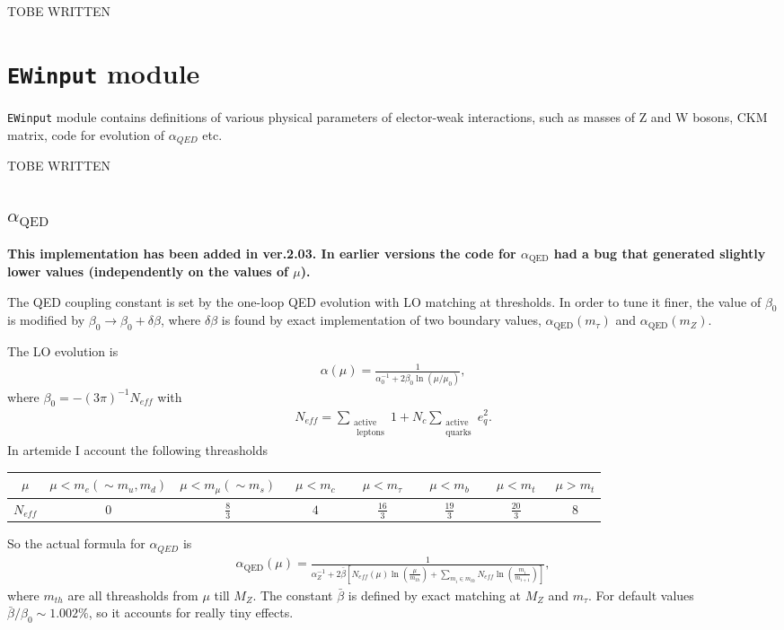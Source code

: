 \documentclass[prd,nofootinbib,eqsecnum,final]{revtex4}
\renewcommand{\(}{\left(}
\renewcommand{\)}{\right)}
\renewcommand{\[}{\left[}
\renewcommand{\]}{\right]}
\newcommand{\red}[1]{{\color[rgb]{1,0,0} #1}}
\begin{document}
\red{TOBE WRITTEN}

\newpage
\section{\texttt{EWinput} module}
\label{EWinput}

\texttt{EWinput} module contains definitions of various physical parameters of elector-weak interactions, such as masses of Z and W bosons, CKM matrix, code for evolution of $\alpha_{QED}$ etc.

\red{TOBE WRITTEN}

\subsection{$\alpha_{\text{QED}}$}

\textbf{This implementation has been added in ver.2.03. In earlier versions the code for $\alpha_{\text{QED}}$ had a bug that generated slightly lower values (independently on the values of $\mu$).}

The QED coupling constant is set by the one-loop QED evolution with LO matching at thresholds. In order to tune it finer, the value of $\beta_0$ is modified by $\beta_0\to \beta_0+\delta \beta$, where $\delta \beta$ is found by exact implementation of two boundary values, $\alpha_{\text{QED}}(m_\tau)$ and $\alpha_{\text{QED}}(m_Z)$. 

The LO evolution is
\begin{eqnarray}
\alpha(\mu)=\frac{1}{\alpha_0^{-1}+2\beta_0 \ln(\mu/\mu_0)},
\end{eqnarray}
where $\beta_0=-(3\pi)^{-1}N_{eff}$ with 
\begin{eqnarray}
N_{eff}=\sum_{\substack{\text{active}\\\text{ leptons}}}1+N_c\sum_{\substack{\text{active}\\\text{quarks}}}e_q^2.
\end{eqnarray}
In artemide I account the following threasholds
\begin{center}
\begin{tabular}{c||c|c|c|c|c|c|c|}
$\mu$   & $\mu<m_e(\sim m_u,m_d)$ & $\mu<m_\mu(\sim m_s)$ & ~$\mu<m_c$~ & ~$\mu<m_\tau$~ & ~$\mu<m_b$~ & ~$\mu<m_t$~ & $\mu>m_t$
\\\hline
$N_{eff}$& 0 & $\frac{8}{3}$ & $4$ & $\frac{16}{3}$ & $\frac{19}{3}$ & $\frac{20}{3}$ & $8$ 
\end{tabular}
\end{center}
So the actual formula for $\alpha_{QED}$ is
\begin{eqnarray}
\alpha_{\text{QED}}(\mu)=\frac{1}{\alpha_Z^{-1}+2\bar \beta\[N_{eff}(\mu)\ln\(\frac{\mu}{m_{th}}\)+\sum_{m_i\in m_{th}} N_{eff}\ln\(\frac{m_{i}}{m_{i+1}}\)\]},
\end{eqnarray}
where $m_{th}$ are all threasholds from $\mu$ till $M_Z$. The constant $\bar \beta$ is defined by exact matching at $M_Z$ and $m_\tau$. For default values $\bar\beta/\beta_0\sim 1.002\%$, so it accounts for really tiny effects.
\end{document}
